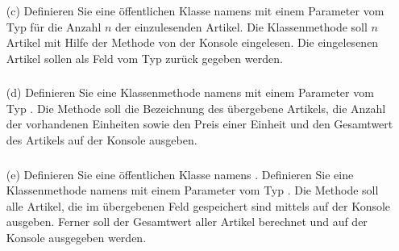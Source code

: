 \begin{frame}%
  \frametitle{\stitle}%
\begin{enumerate}
\item[(c)]
  Definieren Sie eine \"offentlichen Klasse namens  mit einem Parameter vom Typ  für die Anzahl $n$ der einzulesenden Artikel.
  Die Klassenmethode soll $n$ Artikel mit Hilfe der Methode  von der Konsole eingelesen.
  Die eingelesenen Artikel sollen als Feld vom Typ  zur\"uck gegeben werden.
\end{enumerate}
\pause

\end{frame}


\begin{frame}%
  \frametitle{\stitle}%
\begin{enumerate}
\item[(d)]
  Definieren Sie eine Klassenmethode namens  mit einem Parameter vom Typ .
  Die Methode soll die Bezeichnung des übergebene Artikels, die Anzahl der vorhandenen Einheiten sowie den Preis einer Einheit und den Gesamtwert des Artikels auf der Konsole ausgeben.
\end{enumerate}
\pause

\end{frame}


\begin{frame}%
  \frametitle{\stitle}%
\begin{enumerate}
\item[(e)]
  Definieren Sie eine \"offentlichen Klasse namens .
  Definieren Sie eine Klassenmethode namens  mit einem Parameter vom Typ .
  Die Methode soll alle Artikel, die im übergebenen Feld gespeichert sind mittels  auf der Konsole ausgeben.
  Ferner soll der Gesamtwert aller Artikel berechnet und auf der Konsole ausgegeben werden.
\end{enumerate}
\pause

\end{frame}


